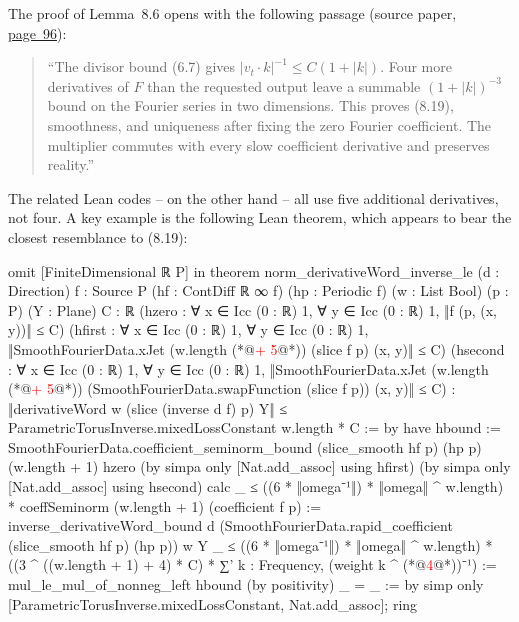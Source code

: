 \documentclass[10pt, a4paper, reqno]{amsart}
\numberwithin{equation}{section}
\renewcommand{\leq}{\leqslant}
\theoremstyle{definition}
\theoremstyle{definition}
\begin{document}
The proof of Lemma~8.6 opens with the following passage (source paper,
\href{https://cdn.openai.com/pdf/32d9f210-8b73-45e0-91bc-82a30aef8a9a/navier-stokes.pdf\#page=96}{page~96}):
\begin{quote}
``The divisor bound (6.7) gives $|v_t\cdot k|^{-1}\leq C(1+|k|)$.
Four more derivatives of $F$ than the requested output leave a summable
$(1+|k|)^{-3}$ bound on the Fourier series in two dimensions.
This proves (8.19), smoothness, and uniqueness after fixing the zero Fourier
coefficient. The multiplier commutes with every slow coefficient derivative
and preserves reality.''
\end{quote}
The related Lean codes -- on the other hand -- all use five additional derivatives, not four. A key example is the following Lean theorem, which appears to bear the closest resemblance to (8.19):
\begin{lstlistinglean}
omit [FiniteDimensional ℝ P] in
theorem norm_derivativeWord_inverse_le (d : Direction) {f : Source P}
    (hf : ContDiff ℝ ∞ f) (hp : Periodic f) (w : List Bool) (p : P) (Y : Plane) {C : ℝ}
    (hzero : ∀ x ∈ Icc (0 : ℝ) 1, ∀ y ∈ Icc (0 : ℝ) 1, ‖f (p, (x, y))‖ ≤ C)
    (hfirst : ∀ x ∈ Icc (0 : ℝ) 1, ∀ y ∈ Icc (0 : ℝ) 1,
      ‖SmoothFourierData.xJet (w.length (*@\textcolor{red}{+ 5}@*)) (slice f p) (x, y)‖ ≤ C)
    (hsecond : ∀ x ∈ Icc (0 : ℝ) 1, ∀ y ∈ Icc (0 : ℝ) 1,
      ‖SmoothFourierData.xJet (w.length (*@\textcolor{red}{+ 5}@*))
        (SmoothFourierData.swapFunction (slice f p)) (x, y)‖ ≤ C) :
    ‖derivativeWord w (slice (inverse d f) p) Y‖ ≤
      ParametricTorusInverse.mixedLossConstant w.length * C := by
  have hbound := SmoothFourierData.coefficient_seminorm_bound (slice_smooth hf p) (hp p)
    (w.length + 1) hzero (by simpa only [Nat.add_assoc] using hfirst)
    (by simpa only [Nat.add_assoc] using hsecond)
  calc
    _ ≤ ((6 * ‖omega⁻¹‖) * ‖omega‖ ^ w.length) *
        coeffSeminorm (w.length + 1) (coefficient f p) :=
      inverse_derivativeWord_bound d
        (SmoothFourierData.rapid_coefficient (slice_smooth hf p) (hp p)) w Y
    _ ≤ ((6 * ‖omega⁻¹‖) * ‖omega‖ ^ w.length) *
        ((3 ^ ((w.length + 1) + 4) * C) * ∑' k : Frequency, (weight k ^ (*@\textcolor{red}{4}@*))⁻¹) :=
      mul_le_mul_of_nonneg_left hbound (by positivity)
    _ = _ := by simp only [ParametricTorusInverse.mixedLossConstant, Nat.add_assoc]; ring
\end{lstlistinglean}

\end{document}
